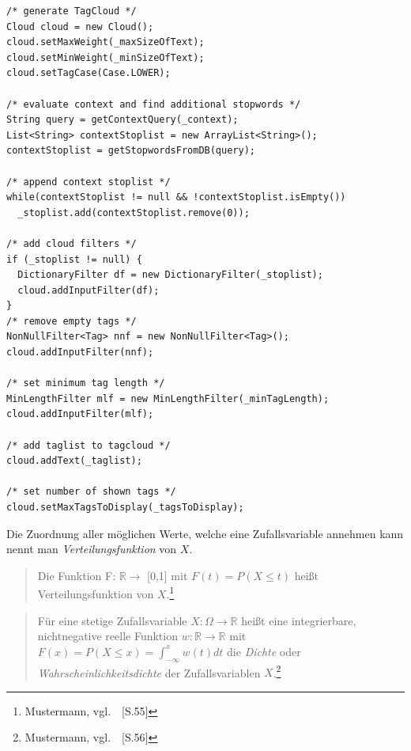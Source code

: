 \lstset{language=java}
\begin{lstlisting}[frame=htrbl, caption={Das Listing zeigt Java Quellcode}, label={lst:result2}]
/* generate TagCloud */
Cloud cloud = new Cloud();
cloud.setMaxWeight(_maxSizeOfText);
cloud.setMinWeight(_minSizeOfText);
cloud.setTagCase(Case.LOWER);
	    
/* evaluate context and find additional stopwords */
String query = getContextQuery(_context);
List<String> contextStoplist = new ArrayList<String>();
contextStoplist = getStopwordsFromDB(query);
	    
/* append context stoplist */
while(contextStoplist != null && !contextStoplist.isEmpty())
  _stoplist.add(contextStoplist.remove(0));
	    
/* add cloud filters */
if (_stoplist != null) {
  DictionaryFilter df = new DictionaryFilter(_stoplist);
  cloud.addInputFilter(df);
}
/* remove empty tags */
NonNullFilter<Tag> nnf = new NonNullFilter<Tag>();
cloud.addInputFilter(nnf);

/* set minimum tag length */
MinLengthFilter mlf = new MinLengthFilter(_minTagLength);
cloud.addInputFilter(mlf);

/* add taglist to tagcloud */
cloud.addText(_taglist);

/* set number of shown tags */	    
cloud.setMaxTagsToDisplay(_tagsToDisplay);
\end{lstlisting}


Die Zuordnung aller möglichen Werte, welche eine Zufallsvariable annehmen kann nennt man \emph{Verteilungsfunktion} von $X$.

\begin{quotation}
Die Funktion F: $\mathbb{R} \rightarrow$ [0,1] mit $F(t) = P (X \le t)$ heißt Verteilungsfunktion von $X$.\footnote{Mustermann, vgl.~\cite{mm2009}~[S.55]}
\end{quotation}

\begin{quotation}
Für eine stetige Zufallsvariable $X: \Omega \rightarrow \mathbb{R}$ heißt eine integrierbare, nichtnegative reelle Funktion $w: \mathbb{R} \rightarrow \mathbb{R}$ mit $F(x) = P(X \le x) = \int_{-\infty}^{x} w(t)dt$ die \emph{Dichte} oder \emph{Wahrscheinlichkeitsdichte} der Zufallsvariablen $X$.\footnote{Mustermann, vgl.~\cite{mf2005}~[S.56]}
\end{quotation}
